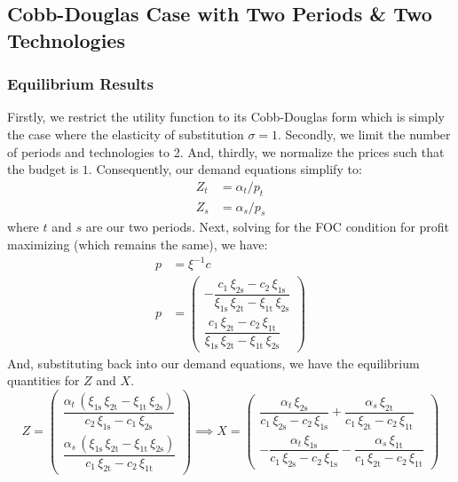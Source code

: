 \documentclass[11pt,a4paper]{extarticle}
\begin{document}
\subsection{Cobb-Douglas Case with Two Periods \& Two Technologies}

\subsubsection{Equilibrium Results}

Firstly, we restrict the utility function to its Cobb-Douglas form which is simply the case where the elasticity of substitution $\sigma = 1$. Secondly, we limit the number of periods and technologies to 2. And, thirdly, we normalize the prices such that the budget is $1$. Consequently, our demand equations simplify to:
\begin{align}
Z_t &= \alpha_t / p_t \\
Z_s &= \alpha_s / p_s
\end{align}
where $t$ and $s$ are our two periods. Next, solving for the FOC condition for profit maximizing (which remains the same), we have:
\begin{align*}
p &=  \xi^{-1} c \\
p &= \begin{pmatrix}
-\dfrac{c_{1}\,\xi _{\mathrm{2s}}-c_{2}\,\xi _{\mathrm{1s}}}{\xi _{\mathrm{1s}}\,\xi _{\mathrm{2t}}-\xi _{\mathrm{1t}}\,\xi _{\mathrm{2s}}}  \\[2ex]
\dfrac{c_{1}\,\xi _{\mathrm{2t}}-c_{2}\,\xi _{\mathrm{1t}}}{\xi _{\mathrm{1s}}\,\xi _{\mathrm{2t}}-\xi _{\mathrm{1t}}\,\xi _{\mathrm{2s}}} 
\end{pmatrix} 
\end{align*}
And, substituting back into our demand equations, we have the equilibrium quantities for $Z$ and $X$. 
$$
Z = \begin{pmatrix}
\dfrac{\alpha _{t}\,\left(\xi _{\mathrm{1s}}\,\xi _{\mathrm{2t}}-\xi _{\mathrm{1t}}\,\xi _{\mathrm{2s}}\right)}{c_{2}\,\xi _{\mathrm{1s}} - c_{1}\,\xi _{\mathrm{2s}}} \\[2ex]
\dfrac{\alpha _{s}\,\left(\xi _{\mathrm{1s}}\,\xi _{\mathrm{2t}}-\xi _{\mathrm{1t}}\,\xi _{\mathrm{2s}}\right)}{c_{1}\,\xi _{\mathrm{2t}}-c_{2}\,\xi _{\mathrm{1t}}} 
\end{pmatrix}
\implies 
X = \begin{pmatrix}
\dfrac{\alpha _{t}\,\xi _{\mathrm{2s}}}{c_{1}\,\xi _{\mathrm{2s}}-c_{2}\,\xi _{\mathrm{1s}}}+\dfrac{\alpha _{s}\,\xi _{\mathrm{2t}}}{c_{1}\,\xi _{\mathrm{2t}}-c_{2}\,\xi _{\mathrm{1t}}} \\[2ex] 
-\dfrac{\alpha _{t}\,\xi _{\mathrm{1s}}}{c_{1}\,\xi _{\mathrm{2s}}-c_{2}\,\xi _{\mathrm{1s}}}-\dfrac{\alpha _{s}\,\xi _{\mathrm{1t}}}{c_{1}\,\xi _{\mathrm{2t}}-c_{2}\,\xi _{\mathrm{1t}}}
\end{pmatrix}
$$
\end{document}
